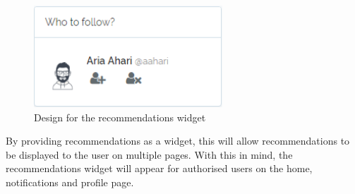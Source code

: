 \begin{figure}[H]
\centering
\includegraphics[height=1.5in]{Images/Design/RecommendationsWidgetDesign}
\caption{Design for the recommendations widget}
\label{fig:RecommendationsWidgetDesign}
\end{figure}

By providing recommendations as a widget, this will allow recommendations to be displayed to the user on multiple pages. With this in mind, the recommendations widget will appear for authorised users on the home, notifications and profile page.
